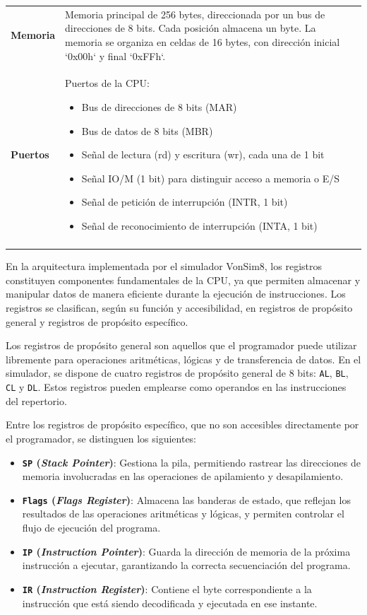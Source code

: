 \documentclass[12pt,oneside]{templates/unerthesis}
\providecommand{\tightlist}{%
  \setlength{\itemsep}{0pt}\setlength{\parskip}{0pt}}
\begin{document}
\begin{table}[!h]
{\begin{tabular}[t]{>{\raggedright\arraybackslash}p{4cm}|p{12cm}}
\addlinespace[10pt]
\textbf{Memoria} & Memoria principal de 256 bytes, direccionada por un bus de direcciones de 8 bits. Cada posición almacena un byte. La memoria se organiza en celdas de 16 bytes, con dirección inicial `0x00h` y final `0xFFh`.\\
\addlinespace[10pt]
\addlinespace
\textbf{Puertos} & Puertos de la CPU:\begin{itemize} \item Bus de direcciones de 8 bits (MAR) \item Bus de datos de 8 bits (MBR) \item Señal de lectura (rd) y escritura (wr), cada una de 1 bit \item Señal IO/M (1 bit) para distinguir acceso a memoria o E/S \item Señal de petición de interrupción (INTR, 1 bit) \item Señal de reconocimiento de interrupción (INTA, 1 bit)\end{itemize}\\
\addlinespace[10pt]
\bottomrule
\end{tabular}}
\end{table}

En la arquitectura implementada por el simulador VonSim8, los registros constituyen componentes fundamentales de la CPU, ya que permiten almacenar y manipular datos de manera eficiente durante la ejecución de instrucciones. Los registros se clasifican, según su función y accesibilidad, en registros de propósito general y registros de propósito específico.

Los registros de propósito general son aquellos que el programador puede utilizar libremente para operaciones aritméticas, lógicas y de transferencia de datos. En el simulador, se dispone de cuatro registros de propósito general de 8 bits: \texttt{AL}, \texttt{BL}, \texttt{CL} y \texttt{DL}. Estos registros pueden emplearse como operandos en las instrucciones del repertorio.

Entre los registros de propósito específico, que no son accesibles directamente por el programador, se distinguen los siguientes:

\begin{itemize}
\tightlist
\item
  \textbf{\texttt{SP} (\emph{Stack Pointer})}: Gestiona la pila, permitiendo rastrear las direcciones de memoria involucradas en las operaciones de apilamiento y desapilamiento.
\item
  \textbf{\texttt{Flags} (\emph{Flags Register})}: Almacena las banderas de estado, que reflejan los resultados de las operaciones aritméticas y lógicas, y permiten controlar el flujo de ejecución del programa.
\item
  \textbf{\texttt{IP} (\emph{Instruction Pointer})}: Guarda la dirección de memoria de la próxima instrucción a ejecutar, garantizando la correcta secuenciación del programa.
\item
  \textbf{\texttt{IR} (\emph{Instruction Register})}: Contiene el byte correspondiente a la instrucción que está siendo decodificada y ejecutada en ese instante.
\end{itemize}
\end{document}
